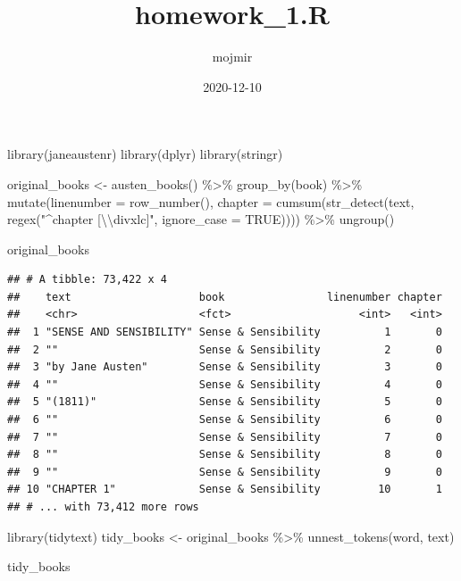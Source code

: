 \documentclass[
]{article}
\title{homework\_1.R}
\author{mojmir}
\date{2020-12-10}
\newenvironment{Shaded}{\begin{snugshade}}{\end{snugshade}}
\newcommand{\AttributeTok}[1]{\textcolor[rgb]{0.77,0.63,0.00}{#1}}
\newcommand{\ConstantTok}[1]{\textcolor[rgb]{0.00,0.00,0.00}{#1}}
\newcommand{\FunctionTok}[1]{\textcolor[rgb]{0.00,0.00,0.00}{#1}}
\newcommand{\NormalTok}[1]{#1}
\newcommand{\OtherTok}[1]{\textcolor[rgb]{0.56,0.35,0.01}{#1}}
\newcommand{\SpecialCharTok}[1]{\textcolor[rgb]{0.00,0.00,0.00}{#1}}
\newcommand{\StringTok}[1]{\textcolor[rgb]{0.31,0.60,0.02}{#1}}
\begin{document}
\maketitle

\begin{Shaded}
\begin{Highlighting}[]
\FunctionTok{library}\NormalTok{(janeaustenr)}
\FunctionTok{library}\NormalTok{(dplyr)}
\FunctionTok{library}\NormalTok{(stringr)}

\NormalTok{original\_books }\OtherTok{\textless{}{-}} \FunctionTok{austen\_books}\NormalTok{() }\SpecialCharTok{\%\textgreater{}\%}
  \FunctionTok{group\_by}\NormalTok{(book) }\SpecialCharTok{\%\textgreater{}\%}
  \FunctionTok{mutate}\NormalTok{(}\AttributeTok{linenumber =} \FunctionTok{row\_number}\NormalTok{(),}
         \AttributeTok{chapter =} \FunctionTok{cumsum}\NormalTok{(}\FunctionTok{str\_detect}\NormalTok{(text, }\FunctionTok{regex}\NormalTok{(}\StringTok{"\^{}chapter [}\SpecialCharTok{\textbackslash{}\textbackslash{}}\StringTok{divxlc]"}\NormalTok{,}
                                                 \AttributeTok{ignore\_case =} \ConstantTok{TRUE}\NormalTok{)))) }\SpecialCharTok{\%\textgreater{}\%}
  \FunctionTok{ungroup}\NormalTok{()}

\NormalTok{original\_books}
\end{Highlighting}
\end{Shaded}

\begin{verbatim}
## # A tibble: 73,422 x 4
##    text                    book                linenumber chapter
##    <chr>                   <fct>                    <int>   <int>
##  1 "SENSE AND SENSIBILITY" Sense & Sensibility          1       0
##  2 ""                      Sense & Sensibility          2       0
##  3 "by Jane Austen"        Sense & Sensibility          3       0
##  4 ""                      Sense & Sensibility          4       0
##  5 "(1811)"                Sense & Sensibility          5       0
##  6 ""                      Sense & Sensibility          6       0
##  7 ""                      Sense & Sensibility          7       0
##  8 ""                      Sense & Sensibility          8       0
##  9 ""                      Sense & Sensibility          9       0
## 10 "CHAPTER 1"             Sense & Sensibility         10       1
## # ... with 73,412 more rows
\end{verbatim}

\begin{Shaded}
\begin{Highlighting}[]
\FunctionTok{library}\NormalTok{(tidytext)}
\NormalTok{tidy\_books }\OtherTok{\textless{}{-}}\NormalTok{ original\_books }\SpecialCharTok{\%\textgreater{}\%}
  \FunctionTok{unnest\_tokens}\NormalTok{(word, text)}

\NormalTok{tidy\_books}
\end{Highlighting}
\end{Shaded}
\end{document}
